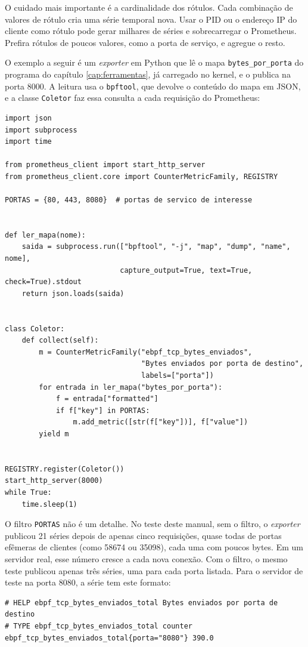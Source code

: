O cuidado mais importante é a cardinalidade dos rótulos. Cada combinação de valores de rótulo cria uma série temporal nova. Usar o PID ou o endereço IP do cliente como rótulo pode gerar milhares de séries e sobrecarregar o Prometheus. Prefira rótulos de poucos valores, como a porta de serviço, e agregue o resto.

O exemplo a seguir é um \textit{exporter} em Python que lê o mapa \texttt{bytes\_por\_porta} do programa do capítulo \ref{cap:ferramentas}, já carregado no kernel, e o publica na porta 8000. A leitura usa o \texttt{bpftool}, que devolve o conteúdo do mapa em JSON, e a classe \texttt{Coletor} faz essa consulta a cada requisição do Prometheus:

\begin{lstlisting}
import json
import subprocess
import time

from prometheus_client import start_http_server
from prometheus_client.core import CounterMetricFamily, REGISTRY

PORTAS = {80, 443, 8080}  # portas de servico de interesse


def ler_mapa(nome):
    saida = subprocess.run(["bpftool", "-j", "map", "dump", "name", nome],
                           capture_output=True, text=True, check=True).stdout
    return json.loads(saida)


class Coletor:
    def collect(self):
        m = CounterMetricFamily("ebpf_tcp_bytes_enviados",
                                "Bytes enviados por porta de destino",
                                labels=["porta"])
        for entrada in ler_mapa("bytes_por_porta"):
            f = entrada["formatted"]
            if f["key"] in PORTAS:
                m.add_metric([str(f["key"])], f["value"])
        yield m


REGISTRY.register(Coletor())
start_http_server(8000)
while True:
    time.sleep(1)
\end{lstlisting}

O filtro \texttt{PORTAS} não é um detalhe. No teste deste manual, sem o filtro, o \textit{exporter} publicou 21 séries depois de apenas cinco requisições, quase todas de portas efêmeras de clientes (como 58674 ou 35098), cada uma com poucos bytes. Em um servidor real, esse número cresce a cada nova conexão. Com o filtro, o mesmo teste publicou apenas três séries, uma para cada porta listada. Para o servidor de teste na porta 8080, a série tem este formato:

\begin{lstlisting}
# HELP ebpf_tcp_bytes_enviados_total Bytes enviados por porta de destino
# TYPE ebpf_tcp_bytes_enviados_total counter
ebpf_tcp_bytes_enviados_total{porta="8080"} 390.0
\end{lstlisting}

